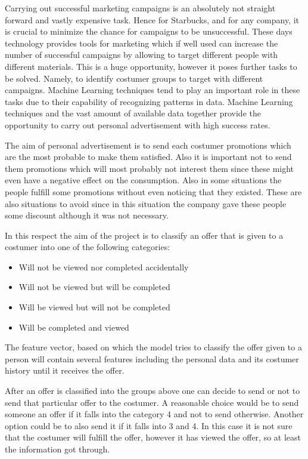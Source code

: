Carrying out successful marketing campaigns is an absolutely not straight forward and vastly expensive task. Hence for Starbucks, and for any company, it is crucial to minimize the chance for campaigns to be unsuccessful. These days technology provides tools for marketing which if well used can increase the number of successful campaigns by allowing to target different people with different materials. This is a huge opportunity, however it poses further tasks to be solved. Namely, to identify costumer groups to target with different campaigns. Machine Learning techniques tend to play an important role in these tasks due to their capability of recognizing patterns in data. Machine Learning techniques and the vast amount of available data together provide the opportunity to carry out personal advertisement with high success rates.

The aim of personal advertisement is to send each costumer promotions which are the most probable to make them satisfied. Also it is important not to send them promotions which will most probably not interest them since these might even have a negative effect on the consumption. Also in some situations the people fulfill some promotions without even noticing that they existed. These are also situations to avoid since in this situation the company gave these people some discount although it was not necessary.

In this respect the aim of the project is to classify an offer that is given to a costumer into one of the following categories:
\begin{itemize}
	\item Will not be viewed nor completed accidentally
	\item Will not be viewed but will be completed
	\item Will be viewed but will not be completed
	\item Will be completed and viewed
\end{itemize}

The feature vector, based on which the model tries to classify the offer given to a person will contain several features including the personal data and its costumer history until it receives the offer.

After an offer is classified into the groups above one can decide to send or not to send that particular offer to the costumer. A reasonable choice would be to send someone an offer if it falls into the category 4 and not to send otherwise. Another option could be to also send it if it falls into 3 and 4. In this case it is not sure that the costumer will fulfill the offer, however it has viewed the offer, so at least the information got through.

